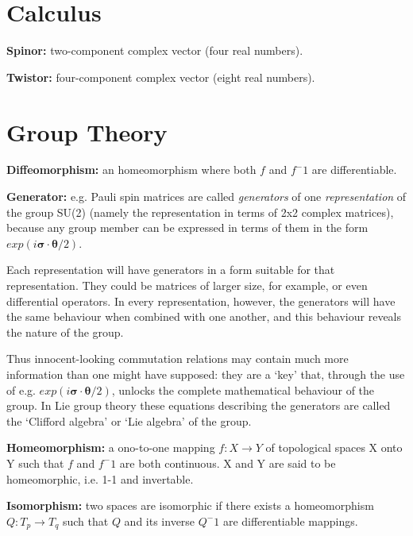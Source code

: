 \section{Calculus}

\begin{list}{}{}
	\item \textbf{Spinor:} two-component complex vector (four real numbers).
	\item \textbf{Twistor:} four-component complex vector (eight real numbers).
\end{list}
	

\section{Group Theory}

\begin{list}{}{}
	\item \textbf{Diffeomorphism:} an homeomorphism where both $f$ and $f^-1$ are differentiable.
	
	\item \textbf{Generator:} e.g. Pauli spin matrices are called \emph{generators} of one \emph{representation} of the group SU(2) (namely the representation in terms of 2x2 complex matrices), because any group member can be expressed in terms of them in the form $exp(i\mathbf{\sigma \cdot\theta}/2)$.

	Each representation will have generators in a form suitable for that representation. They could be matrices of larger size, 	for example, or even differential operators. In every representation, however, the generators will have the same 	behaviour when combined with one another, and this behaviour reveals the nature of the group.

	Thus innocent-looking commutation relations may contain	much more information than one might have supposed: 	they are a ‘key’ that, through the use of e.g. $exp(i\mathbf{\sigma \cdot\theta}/2)$, unlocks the complete mathematical behaviour of the group. In Lie group theory these equations describing the generators are called the ‘Clifford algebra’ or ‘Lie algebra’ of the group.
	
	\item \textbf{Homeomorphism:} a ono-to-one mapping $f: X \rightarrow Y$ of topological spaces X onto Y such that $f$ and $f^-1$ are both continuous. X and Y are said to be homeomorphic, i.e. 1-1 and invertable.
	
	\item \textbf{Isomorphism:} two spaces are isomorphic if there exists a homeomorphism $Q:T_p \rightarrow T_q$ such that $Q$ and its inverse $Q^-1$ are differentiable mappings.
	

\end{list}
